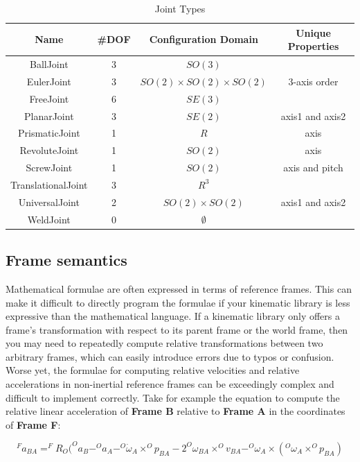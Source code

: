 \begin{table}[h]
\centering
\caption{Joint Types}
\begin{tabular}{|c|c|c|c|}
  \hline
  \textbf{Name} & \textbf{\#DOF} & \textbf{Configuration Domain}  & \textbf{Unique Properties}\\
  \hline
  BallJoint  &  3 & $SO(3)$  & \\
  \hline
  EulerJoint & 3  & $SO(2) \times SO(2) \times SO(2)$ & 3-axis order \\
  \hline
  FreeJoint  & 6 & $SE(3)$  &\\
  \hline
  PlanarJoint & 3  & $SE(2)$ & axis1 and axis2 \\
  \hline
  PrismaticJoint & 1  & $R$ & axis \\
  \hline
  RevoluteJoint & 1  & $SO(2)$ & axis \\
  \hline
  ScrewJoint & 1  & $SO(2)$ & axis and pitch \\
  \hline
  TranslationalJoint & 3  & $R^3$ &  \\
  \hline
  UniversalJoint & 2  & $SO(2) \times SO(2)$ & axis1 and axis2 \\
  \hline
  WeldJoint & 0  & $\emptyset$ &  \\
  \hline
\end{tabular}
\label{tab:jointTypes}
\end{table}

\subsection{Frame semantics}
Mathematical formulae are often expressed in terms of reference frames. This can make it difficult to directly program the formulae if your kinematic library is less expressive than the mathematical language. If a kinematic library only offers a frame's transformation with respect to its parent frame or the world frame, then you may need to repeatedly compute relative transformations between two arbitrary frames, which can easily introduce errors due to typos or confusion. Worse yet, the formulae for computing relative velocities and relative accelerations in non-inertial reference frames can be exceedingly complex and difficult to implement correctly. Take for example the equation to compute the relative linear acceleration of \textbf{Frame B} relative to \textbf{Frame A} in the coordinates of \textbf{Frame F}:

\begin{equation}
\label{eqn:rel_accel}
^{F}a_{BA} = ^{F}R_{O} ( ^{O}a_{B} - ^{O}a_{A} - ^{O}\dot{\omega}_{A} \times ^{O}p_{BA} - 2 ^{O}\omega_{BA} \times ^{O}v_{BA} - ^{O}\omega_A \times (^{O}\omega_{A} \times ^{O}p_{BA})
\end{equation}

